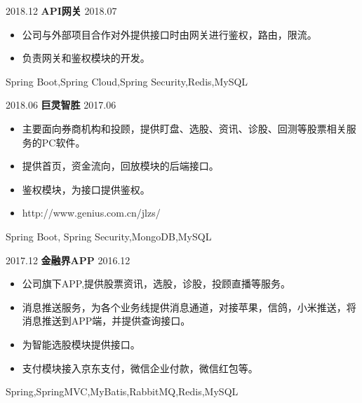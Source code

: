 %
%
%
%
%


\begin{projects}

  \project
    {2018.12} {\textbf{API网关}}
    {2018.07} {
                      \begin{itemize}
                        \item 公司与外部项目合作对外提供接口时由网关进行鉴权，路由，限流。
                        \item 负责网关和鉴权模块的开发。
                      \end{itemize}
                    }
                    {Spring Boot,Spring Cloud,Spring Security,Redis,MySQL}
  \emptySeparator


  \project
    {2018.06}   {\textbf{巨灵智胜}}
    {2017.06} {
                      \begin{itemize}
                        \item 主要面向券商机构和投顾，提供盯盘、选股、资讯、诊股、回测等股票相关服务的PC软件。
                        \item 提供首页，资金流向，回放模块的后端接口。
                        \item 鉴权模块，为接口提供鉴权。
                        \item http://www.genius.com.cn/jlzs/
                      \end{itemize}
                    }
                    {Spring Boot, Spring Security,MongoDB,MySQL}
  \emptySeparator

  \project
    {2017.12}   {\textbf{金融界APP}}
    {2016.12} {
                      \begin{itemize}
                        \item 公司旗下APP,提供股票资讯，选股，诊股，投顾直播等服务。
                        \item 消息推送服务，为各个业务线提供消息通道，对接苹果，信鸽，小米推送，将消息推送到APP端，并提供查询接口。
                        \item 为智能选股模块提供接口。
                        \item 支付模块接入京东支付，微信企业付款，微信红包等。
                      \end{itemize}
                    }
                    {Spring,SpringMVC,MyBatis,RabbitMQ,Redis,MySQL}
  \emptySeparator


\end{projects}
